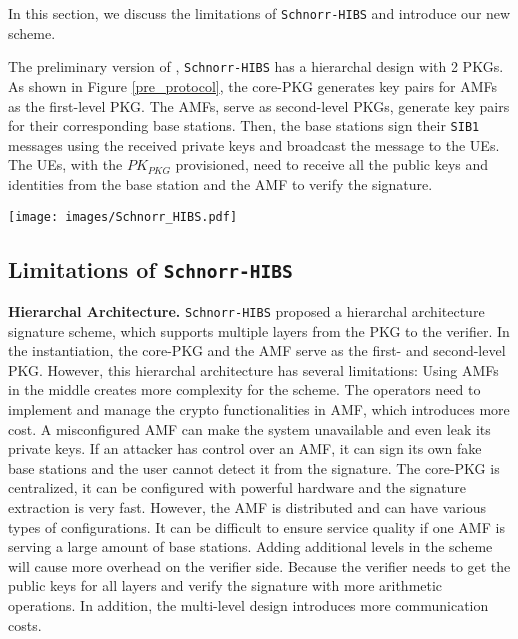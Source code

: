 In this section, we discuss the limitations of \texttt{Schnorr-HIBS} and introduce our new scheme. 

The preliminary version of \scheme{}, \texttt{Schnorr-HIBS} has a hierarchal design with 2 PKGs. As shown in Figure \ref{pre_protocol}, the core-PKG generates key pairs for AMFs as the first-level PKG. The AMFs, serve as second-level PKGs, generate key pairs for their corresponding base stations. Then, the base stations sign their \texttt{SIB1} messages using the received private keys and broadcast the message to the UEs. The UEs, with the $PK_{PKG}$ provisioned, need to receive all the public keys and identities from the base station and the AMF to verify the signature. 

\begin{figure*}[t]
 \centering
    \texttt{[image: images/Schnorr\_HIBS.pdf]}
    \caption{Instantiation of \texttt{Schnorr-HIBS}. }
        \label{pre_protocol}
\end{figure*}

\subsection{\texorpdfstring{Limitations of \texttt{Schnorr-HIBS} \cite{singla2021look}}{Limitations of Schnorr-HIBS}}
\label{limitations}

\noindent \textbf{Hierarchal Architecture. }
\texttt{Schnorr-HIBS} proposed a hierarchal architecture signature scheme, which supports multiple layers from the PKG to the verifier. In the instantiation, the core-PKG and the AMF serve as the first- and second-level PKG. However, this hierarchal architecture has several limitations:  Using AMFs in the middle creates more complexity for the scheme. The operators need to implement and manage the crypto functionalities in AMF, which introduces more cost. A misconfigured AMF can make the system unavailable and even leak its private keys. If an attacker has control over an AMF, it can sign its own fake base stations and the user cannot detect it from the signature.  The core-PKG is centralized, it can be configured with powerful hardware and the signature extraction is very fast. However, the AMF is distributed and can have various types of configurations. It can be difficult to ensure service quality if one AMF is serving a large amount of base stations.  Adding additional levels in the scheme will cause more overhead on the verifier side. Because the verifier needs to get the public keys for all layers and verify the signature with more arithmetic operations. In addition, the multi-level design introduces more communication costs. 

